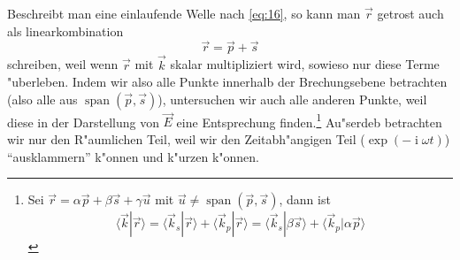 \documentclass[twoside,a4paper]{book}
\newcommand{\I}{\ensuremath{\operatorname{i}}}
\begin{document}
Beschreibt man eine einlaufende Welle nach \eqref{eq:16}, so kann man
$\vec r$ getrost auch als linearkombination
\begin{equation*}
   \vec r = \vec p + \vec s
\end{equation*}
schreiben, weil wenn $\vec r$ mit $\vec k$ skalar multipliziert wird,
sowieso nur diese Terme "uberleben. Indem wir also alle Punkte
innerhalb der Brechungsebene betrachten (also alle aus
$\operatorname{span}(\vec p, \vec s)$), untersuchen wir auch alle
anderen Punkte, weil diese in der Darstellung von $\vec E$ eine
Entsprechung finden.\footnote{Sei $\vec r = \alpha \vec p + \beta \vec
s + \gamma \vec u$ mit $\vec u \neq \operatorname{span}(\vec p, \vec
s)$, dann ist
\begin{equation*}
   \langle \vec k | \vec r  \rangle = 
\langle \vec k_s | \vec r  \rangle + \langle \vec k_p | \vec r
\rangle 
=
\langle \vec k_s  | \beta \vec s  \rangle + \langle \vec k_p | \alpha
\vec p  \rangle
\end{equation*}
} Au"serdeb betrachten wir nur den R"aumlichen Teil, weil wir den
Zeitabh"angigen Teil ($\exp ( - \I \omega t)$) "`ausklammern"' k"onnen
und k"urzen k"onnen.
\end{document}
